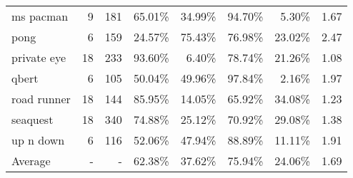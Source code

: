\begin{table}[h!]
\begin{tabular}{l|rrrrrrr}
    ms pacman & 9 & 181 & 65.01\% & 34.99\% & 94.70\% & 5.30\% & 1.67 \\
    pong & 6 & 159 & 24.57\% & 75.43\% & 76.98\% & 23.02\% & 2.47 \\
    private eye & 18 & 233 & 93.60\% & 6.40\% & 78.74\% & 21.26\% & 1.08 \\
    qbert & 6 & 105 & 50.04\% & 49.96\% & 97.84\% & 2.16\% & 1.97 \\
    road runner & 18 & 144 & 85.95\% & 14.05\% & 65.92\% & 34.08\% & 1.23 \\
    seaquest & 18 & 340 & 74.88\% & 25.12\% & 70.92\% & 29.08\% & 1.38 \\
    up n down & 6 & 116 & 52.06\% & 47.94\% & 88.89\% & 11.11\% & 1.91 \\
    \midrule
    Average & - & - & 62.38\% & 37.62\% & 75.94\% & 24.06\% & 1.69 \\
    \bottomrule
\end{tabular}
\label{tab:option-usage-op3}
\end{table}

